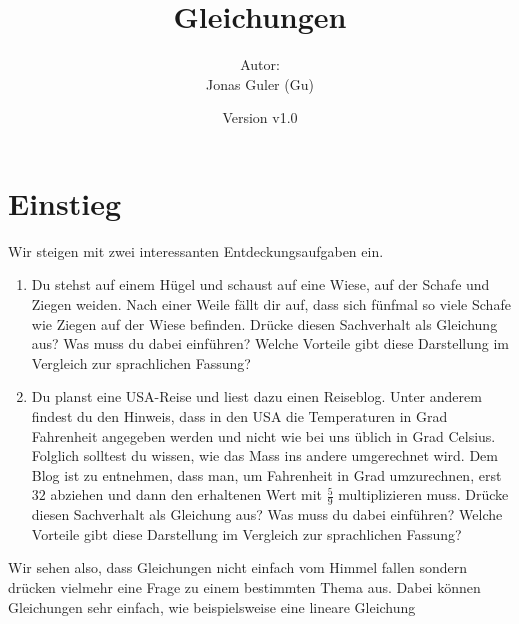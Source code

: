 \documentclass[11pt,oneside]{article}
\newcommand{\Skriptname}{Gleichungen}
\newcommand{\Autor}{Jonas Guler (Gu)}
\newcommand{\version}{v1.0}
\begin{document}
\begin{titlepage}
	\clearpage
	\title{\Huge\textbf{\Skriptname} \\[1cm]}
	\author{Autor:\\ \Autor}
	\date{\normalsize {Version \version}\\ \datelong}
	\maketitle
    \thispagestyle{empty}
    \vfill
    \tableofcontents
\end{titlepage}
\section{Einstieg}
    Wir steigen mit zwei interessanten Entdeckungsaufgaben ein.
    \begin{aufgabe}
        \begin{enumerate}
            \item Du stehst auf einem Hügel und schaust auf eine Wiese, auf der Schafe und Ziegen weiden. Nach einer Weile fällt dir auf, dass sich fünfmal so viele Schafe wie Ziegen auf der Wiese befinden. Drücke diesen Sachverhalt als Gleichung aus? Was muss du dabei einführen? Welche Vorteile gibt diese Darstellung im Vergleich zur sprachlichen Fassung?
        \end{enumerate}
        \begin{enumerate}\setcounter{enumi}{1}
            \item Du planst eine USA-Reise und liest dazu einen Reiseblog. Unter anderem findest du den Hinweis, dass in den USA die Temperaturen in Grad Fahrenheit angegeben werden und nicht wie bei uns üblich in Grad Celsius. Folglich solltest du wissen, wie das Mass ins andere umgerechnet wird. Dem Blog ist zu entnehmen, dass man, um Fahrenheit in Grad umzurechnen, erst $32$ abziehen und dann den erhaltenen Wert mit $\frac{5}{9}$ multiplizieren muss. Drücke diesen Sachverhalt als Gleichung aus? Was muss du dabei einführen? Welche Vorteile gibt diese Darstellung im Vergleich zur sprachlichen Fassung?
        \end{enumerate}
    \end{aufgabe}
    Wir sehen also, dass Gleichungen nicht einfach vom Himmel fallen sondern drücken vielmehr eine Frage zu einem bestimmten Thema aus. Dabei können Gleichungen sehr einfach, wie beispielsweise eine lineare Gleichung
\end{document}
